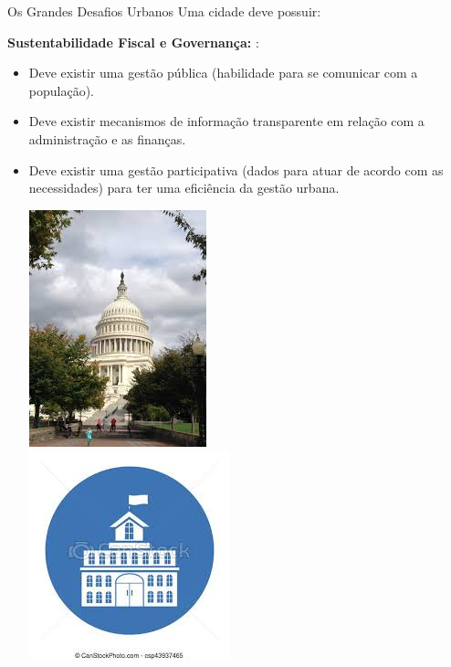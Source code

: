 \documentclass{beamer}
\begin{document}
\begin{frame}{Os Grandes Desafios Urbanos }
Uma cidade deve possuir:
\begin{block}{{\bf{Sustentabilidade Fiscal e Governança:}} :}
\begin{itemize}
 \item Deve existir uma gestão pública (habilidade para se comunicar com a população).
 \item Deve existir mecanismos de informação transparente em relação com a administração e as finanças.
 \item Deve existir uma gestão participativa (dados para atuar de acordo com as necessidades) para ter uma eficiência da gestão urbana.
 \begin{center}
  \includegraphics[width=.156\textwidth]{img/guverno1.jpeg}\ \ \ \ \ \ \ \ \ \ \ \ \ \ \ \ \ \ \ \ \ \ \ \ \ \ \ \ 
  \includegraphics[width=.2\textwidth]{img/guverno2.jpeg}
  
 \end{center}

\end{itemize}\end{block}
\end{frame}
\end{document}
